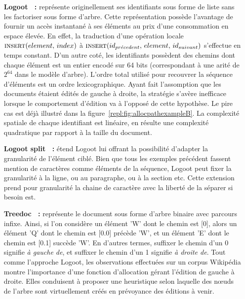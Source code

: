 \begin{itemize}
\item [\textbf{Logoot~\cite{weiss2009logoot, weiss2010logootundo} :}] représente
  originellement ses identifiants sous forme de liste sans les factoriser sous
  forme d'arbre. Cette représentation possède l'avantage de fournir un accès
  instantané à ses éléments au prix d'une consommation en espace élevée. En
  effet, la traduction d'une opération locale
  $\textsc{insert}(element,\, index)$ à
  $\textsc{insert}(id_{pr\acute{e}cedent},\, element,\, id_{suivant})$ s'effectue en
  temps constant. D'un autre coté, les identifiants possèdent des chemins dont
  chaque élément est un entier encodé sur 64 bits (correspondant à une arité de
  $2^{64}$ dans le modèle d'arbre). L'ordre total utilisé pour recouvrer la
  séquence d'éléments est un ordre lexicographique. Ayant fait l'assomption que
  les documents étaient édités de gauche à droite, la stratégie s'avère
  inefficace lorsque le comportement d'édition va à l'opposé de cette
  hypothèse. Le pire cas est déjà illustré dans la
  figure~\ref{repl:fig:allocpathexampleB}. La complexité spatiale de chaque
  identifiant est linéaire, en résulte une complexité quadratique par rapport à
  la taille du document.
\item [\textbf{Logoot split~\cite{mehdi2014merging} :}] étend Logoot lui offrant
  la possibilité d'adapter la granularité de l'élément ciblé. Bien que tous les
  exemples précédent fassent mention de caractères comme éléments de la
  séquence, Logoot peut fixer la granularité à la ligne, ou au paragraphe, ou à
  la section etc. Cette extension prend pour granularité la chaine de caractère
  avec la liberté de la séparer si besoin est.
\item [\textbf{Treedoc~\cite{shapiro2011comprehensive} :}] représente le
  document sous forme d'arbre binaire avec parcours infixe.  Ainsi, si l'on
  considère un élément 'W' dont le chemin est [0], alors un élément 'Q' dont le
  chemin est [0.0] précède 'W', et un élément 'E' dont le chemin est [0.1]
  succède 'W'. En d'autres termes, suffixer le chemin d'un 0 signifie \emph{à
    gauche de}, et suffixer le chemin d'un 1 signifie \emph{à droite de}. Tout
  comme l'approche Logoot, les observations effectuées sur un corpus Wikipédia
  montre l'importance d'une fonction d'allocation gérant l'édition de gauche à
  droite. Elles conduisent à proposer une heuristique selon laquelle des nœuds
  de l'arbre sont virtuellement créés en prévoyance des éditions à venir. 
\end{itemize}

